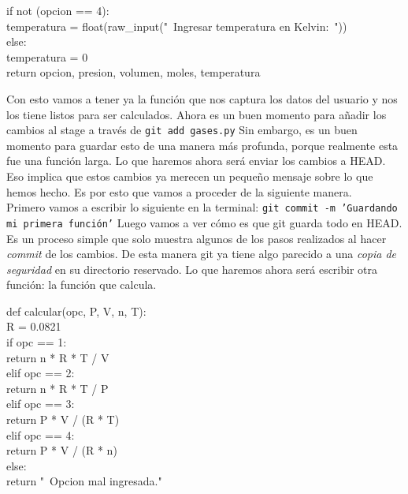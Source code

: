 \documentclass[10pt,letterpaper]{article}
\newcommand{\inlinecode}[1]{
\colorbox{light-gray}{\texttt{#1}}
}
\newenvironment{Code}
{
\begin{lrbox}{\selvestebox}%
\begin{minipage}{\dimexpr\columnwidth-2\fboxsep\relax}
\fontfamily{\ttdefault}\selectfont
}
{\end{minipage}\end{lrbox}%
\begin{center}
\colorbox{light-gray}{\usebox{\selvestebox}}
\end{center}
}
\begin{document}
\begin{Code}
\hspace*{8mm}if not (opcion == 4):\\
\hspace*{16mm}temperatura = float(raw\_input("\ \hspace*{-2mm}Ingresar temperatura en Kelvin:\ "))\\
\hspace*{8mm}else:\\
\hspace*{16mm}temperatura = 0\\
\hspace*{8mm} return opcion, presion, volumen, moles, temperatura
\end{Code}

Con esto vamos a tener ya la funci\'on que nos captura los datos del usuario y nos los tiene listos para ser calculados. Ahora es un buen momento para a\~nadir los cambios al stage a trav\'es de \inlinecode{git add gases.py} Sin embargo, es un buen momento para guardar esto de una manera m\'as profunda, porque realmente esta fue una funci\'on larga. Lo que haremos ahora ser\'a enviar los cambios a HEAD. Eso implica que estos cambios ya merecen un peque\~no mensaje sobre lo que hemos hecho. Es por esto que vamos a proceder de la siguiente manera.\\

Primero vamos a escribir lo siguiente en la terminal: \inlinecode{git commit -m 'Guardando mi primera funci\'on'} Luego vamos a ver c\'omo es que git guarda todo en HEAD. Es un proceso simple que solo muestra algunos de los pasos realizados al hacer \emph{commit} de los cambios. De esta manera git ya tiene algo parecido a una \textit{copia de seguridad} en su directorio reservado. Lo que haremos ahora ser\'a escribir otra funci\'on: la funci\'on que calcula.

\begin{Code}
def calcular(opc, P, V, n, T):\\
\hspace*{8mm}R = 0.0821\\
\hspace*{8mm}if opc == 1:\\
\hspace*{16mm}return n * R * T / V\\
\hspace*{8mm}elif opc == 2:\\
\hspace*{16mm}return n * R * T / P\\
\hspace*{8mm}elif opc == 3:\\
\hspace*{16mm}return P * V / (R * T)\\
\hspace*{8mm}elif opc == 4:\\
\hspace*{16mm}return P * V / (R * n)\\
\hspace*{8mm}else:\\
\hspace*{16mm}return "\ \hspace*{-1.5mm}Opcion mal ingresada."
\end{Code}
\end{document}
